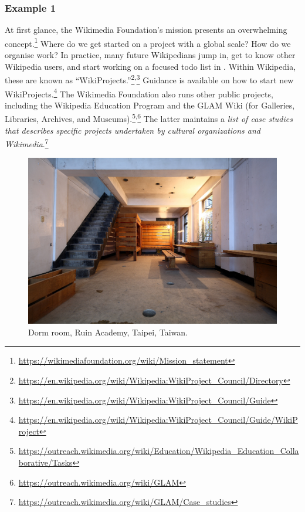\subsubsection*{Example 1}
At first glance, the Wikimedia Foundation's mission presents an overwhelming concept.\footnote{\url{https://wikimediafoundation.org/wiki/Mission_statement}} Where do we get started on a project with a global scale? How do we organise work?
In practice, many future Wikipedians jump in, get to know other Wikipedia users, and start working on a focused todo list in
.
Within Wikipedia, these are known as ``WikiProjects.''\footnote{\url{https://en.wikipedia.org/wiki/Wikipedia:WikiProject_Council/Directory}}\textsuperscript{,}\footnote{\url{https://en.wikipedia.org/wiki/Wikipedia:WikiProject_Council/Guide}}
Guidance is available on how to start new WikiProjects.\footnote{\url{https://en.wikipedia.org/wiki/Wikipedia:WikiProject_Council/Guide/WikiProject}}
The Wikimedia Foundation also runs other public projects, including the Wikipedia Education Program and the GLAM Wiki (for Galleries, Libraries, Archives, and Museums).\footnote{\url{https://outreach.wikimedia.org/wiki/Education/Wikipedia_Education_Collaborative/Tasks}}\textsuperscript{,}\footnote{\url{https://outreach.wikimedia.org/wiki/GLAM}}  The latter maintains a \emph{list of case studies that describes specific projects undertaken by cultural organizations and Wikimedia}.\footnote{\url{https://outreach.wikimedia.org/wiki/GLAM/Case_studies}}

\begin{figure}
\vspace{-1.0cm}
\begin{center}
\includegraphics[width=.45\textwidth]{Ruin_Academy_Dorm}
\end{center}
\vspace{-.5cm}
\caption{Dorm room, Ruin Academy, Taipei, Taiwan. 
\label{dormitory}
}
\vspace{-1.1cm}
\end{figure}

